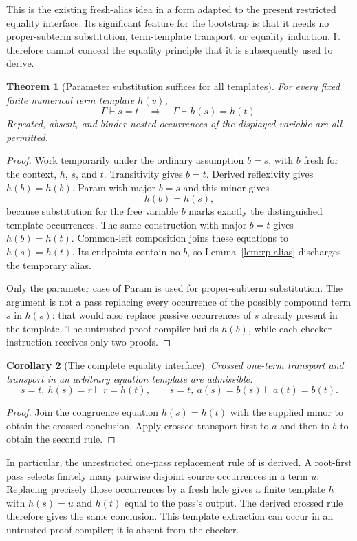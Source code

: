 \documentclass[11pt,letterpaper]{article}
\newtheorem{theorem}{Theorem}[section]
\newtheorem{corollary}[theorem]{Corollary}
\begin{document}
This is the existing fresh-alias idea in a form adapted to the present
restricted equality interface.  Its significant feature for the
bootstrap is that it needs no proper-subterm substitution, term-template
transport, or equality induction.  It therefore cannot conceal the
equality principle that it is subsequently used to derive.

\begin{theorem}[Parameter substitution suffices for all templates]
\label{thm:rp-congruence}
For every fixed finite numerical term template $h(v)$,
\[
 \Gamma\vdash s=t
 \quad\Longrightarrow\quad
 \Gamma\vdash h(s)=h(t).
\]
Repeated, absent, and binder-nested occurrences of the displayed variable
are all permitted.
\end{theorem}
\begin{proof}
Work temporarily under the ordinary assumption $b=s$, with $b$ fresh
for the context, $h$, $s$, and $t$.  Transitivity gives $b=t$.
Derived reflexivity gives $h(b)=h(b)$.  Param with major $b=s$ and
this minor gives
\[
 h(b)=h(s),
\]
because substitution for the free variable $b$ marks exactly the
distinguished template occurrences.  The same construction with major
$b=t$ gives $h(b)=h(t)$.  Common-left composition joins these equations
to $h(s)=h(t)$.  Its endpoints contain no $b$, so
Lemma~\ref{lem:rp-alias} discharges the temporary alias.

Only the parameter case of Param is used for proper-subterm substitution.
The argument is not a pass replacing every occurrence of the possibly
compound term $s$ in $h(s)$: that would also replace passive occurrences
of $s$ already present in the template.  The untrusted proof compiler
builds $h(b)$, while each checker instruction receives only two proofs.
\end{proof}

\begin{corollary}[The complete equality interface]
Crossed one-term transport and transport in an arbitrary equation template
are admissible:
\[
 s=t,\ h(s)=r\vdash r=h(t),\qquad
 s=t,\ a(s)=b(s)\vdash a(t)=b(t).
\]
\end{corollary}
\begin{proof}
Join the congruence equation $h(s)=h(t)$ with the supplied minor to obtain
the crossed conclusion.  Apply crossed transport first to $a$ and then
to $b$ to obtain the second rule.
\end{proof}

In particular, the unrestricted one-pass replacement rule of
\cite{templatefree} is derived.  A root-first pass selects finitely many
pairwise disjoint source occurrences in a term $u$.  Replacing precisely
those occurrences by a fresh hole gives a finite template $h$ with
$h(s)=u$ and $h(t)$ equal to the pass's output.  The derived crossed
rule therefore gives the same conclusion.  This template extraction
can occur in an untrusted proof compiler; it is absent from the checker.
\end{document}
